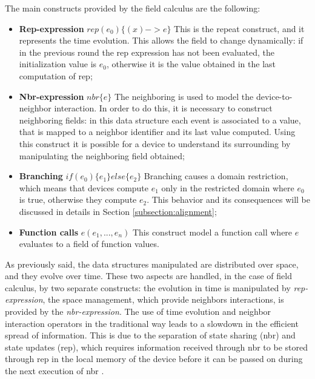 The main constructs provided by the field calculus are the following:
\begin{itemize}
    \item \textbf{Rep-expression} $rep(e_0)\{(x)-> e\}$ \newline
    This is the repeat construct, and it represents the time evolution. This allows the field to change dynamically: if in the previous round the rep expression has not been evaluated, the initialization value is $e_0$, otherwise it is the value obtained in the last computation of rep;
    \item \textbf{Nbr-expression} $nbr\{e\}$\newline
    The neighboring is used to model the device-to-neighbor interaction. In order to do this, it is necessary to construct neighboring fields: in this data structure each event is associated to a value, that is mapped to a neighbor identifier and its last value computed. Using this construct it is possible for a device to understand its surrounding by manipulating the neighboring field obtained;
    \item \textbf{Branching} $if(e_0)\{e_1\} else \{e_2\}$\newline
    Branching causes a domain restriction, which means that devices compute $e_1$ only in the restricted domain where $e_0$ is true, otherwise they compute $e_2$. This behavior and its consequences will be discussed in details in Section \ref{subsection:alignment};
    \item \textbf{Function calls} $e(e_1, ..., e_n)$ \newline
    This construct model a function call where $e$ evaluates to a field of function values. 
\end{itemize}

As previously said, the data structures manipulated are distributed over space, and they evolve over time. These two aspects are handled, in the case of field calculus, by two separate constructs: the evolution in time is manipulated by \textit{rep-expression}, the space management, which provide neighbors interactions, is provided by the \textit{nbr-expression}.\newline
The use of time evolution and neighbor interaction operators in the traditional way leads to a slowdown in the efficient spread of information. This is due to the separation of state sharing (nbr) and state updates (rep), which requires information received through nbr to be stored through rep in the local memory of the device before it can be passed on during the next execution of nbr \cite{share_operator}. 

